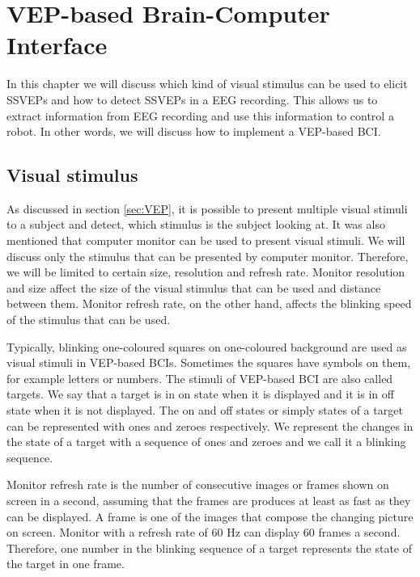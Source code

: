 
\chapter{VEP-based Brain-Computer Interface}

In this chapter we will discuss which kind of visual stimulus can be used to elicit \glspl{SSVEP} and how to detect \glspl{SSVEP} in a \gls{EEG} recording. This allows us to extract information from EEG recording and use this information to control a robot. In other words, we will discuss how to implement a \gls{VEP}-based \gls{BCI}.

\section{Visual stimulus}

As discussed in section \ref{sec:VEP}, it is possible to present multiple visual stimuli to a subject and detect, which stimulus is the subject looking at. It was also mentioned that computer monitor can be used to present visual stimuli. We will discuss only the stimulus that can be presented by computer monitor. Therefore, we will be limited to certain size, resolution and refresh rate. Monitor resolution and size affect the size of the visual stimulus that can be used and distance between them. Monitor refresh rate, on the other hand, affects the blinking speed of the stimulus that can be used.

Typically, blinking one-coloured squares on one-coloured background are used as visual stimuli in \gls{VEP}-based \glspl{BCI}. Sometimes the squares have symbols on them, for example letters or numbers. The stimuli of \gls{VEP}-based \gls{BCI} are also called targets. We say that a target is in on state when it is displayed and it is in off state when it is not displayed. The on and off states or simply states of a target can be represented with ones and zeroes respectively. We represent the changes in the state of a target with a sequence of ones and zeroes and we call it a blinking sequence.

Monitor refresh rate is the number of consecutive images or frames shown on screen in a second, assuming that the frames are produces at least as fast as they can be displayed. A frame is one of the images that compose the changing picture on screen. Monitor with a refresh rate of 60 Hz can display 60 frames a second. Therefore, one number in the blinking sequence of a target represents the state of the target in one frame.

